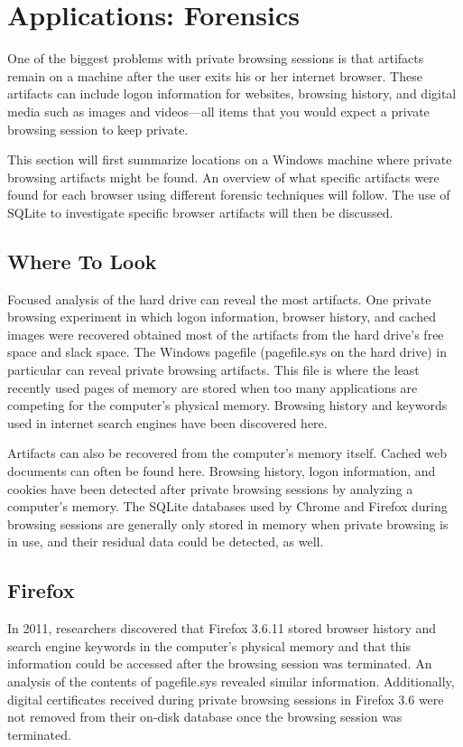 \documentclass[pdftex,letterpaper,titlepage,12pt]{article}
\begin{document}
  \section{Applications: Forensics}
  One of the biggest problems with private browsing sessions is that artifacts
  remain on a machine after the user exits his or her internet browser. These
  artifacts can include logon information for websites, browsing history,
  and digital media such as images and videos---all items that you would expect
  a private browsing session to keep private.\cite{ohana13}

  This section will first summarize locations on a Windows machine where
  private browsing artifacts might be found. An overview of what specific
  artifacts were found for each browser using different forensic techniques
  will follow. The use of SQLite to investigate specific browser artifacts will
  then be discussed.

    \subsection{Where To Look}
    Focused analysis of the hard drive can reveal the most artifacts.
    One private browsing experiment in which logon information, browser
    history, and cached images were recovered obtained most of the artifacts
    from the hard drive's free space and slack space.\cite{ohana13} The 
	Windows pagefile (pagefile.sys on the hard drive) in particular can reveal
	private browsing artifacts. This file is where the least recently used 
	pages of memory are stored when too many applications are competing for the
	computer's physical memory. Browsing history and keywords used in internet 
	search engines have been discovered here.\cite{said11}

    Artifacts can also be recovered from the computer's memory itself. Cached
    web documents can often be found here.\cite{ohana13} Browsing history,
    logon information, and cookies have been detected after private browsing
    sessions by analyzing a computer's memory. The SQLite databases used by 
    Chrome and Firefox during browsing sessions are generally only stored in 
    memory when private browsing is in use, and their residual data could be 
    detected, as well.\cite{satvat13}

    \subsection{Firefox}
	In 2011, researchers discovered that Firefox 3.6.11 stored browser history
	and search engine keywords in the computer's physical memory and that this
	information could be accessed after the browsing session was terminated.
	An analysis of the contents of pagefile.sys revealed similar information.
	\cite{said11} Additionally, digital certificates received during private 
	browsing sessions in Firefox 3.6 were not removed from their on-disk 
	database once the browsing session was terminated.\cite{aggarwal10} 
\end{document}
